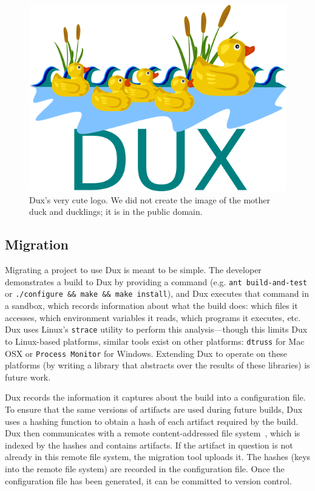 \documentclass[10pt,conference]{IEEEtran}
\begin{document}
\begin{figure}
\includegraphics[width=\columnwidth]{DUX}
\caption{Dux's very cute logo. We did not create the image of the mother duck and ducklings; it is in the public domain.}
\end{figure}

\subsection{Migration}

Migrating a project to use Dux is meant to be simple.
The developer demonstrates a build to Dux by providing a command (e.g. \texttt{ant build-and-test}
or \texttt{./configure \&\& make \&\& make install}),
and Dux executes that command in a sandbox, which records information about what the build does:
which files it accesses, which environment variables it reads, which programs it executes, etc.
Dux uses Linux's \texttt{strace} utility to perform this analysis---though this limits Dux to
Linux-based platforms, similar tools exist on other platforms: \texttt{dtruss} for Mac OSX or
\texttt{Process Monitor} for Windows. Extending Dux to operate on these platforms (by writing a
library that abstracts over the results of these libraries) is future work.

Dux records the information it captures about the build into a configuration file.
To ensure that the same versions of artifacts are used during future builds,
Dux uses a hashing function to obtain a hash of each artifact required by the build.
Dux then communicates with a remote content-addressed file system~\cite{venti},
which is indexed by the hashes and contains artifacts.
If the artifact in question is not already in this remote file system, the migration tool uploads it.
The hashes (keys into the remote file system) are recorded in the configuration file.
Once the configuration file has been generated, it can be committed to version control.
\end{document}
